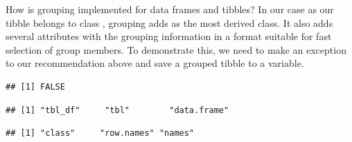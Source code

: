 \documentclass[krantz2]{krantz}\usepackage{knitr}
\begin{document}
\begin{warningbox}
How is grouping implemented for data frames and tibbles? In our case as our tibble belongs to class , grouping adds  as the most derived class. It also adds several attributes with the grouping information in a format suitable for fast selection of group members. To demonstrate this, we need to make an exception to our recommendation above and save a grouped tibble to a variable.

\begin{knitrout}\footnotesize
{}\color{fgcolor}\begin{kframe}
\begin{alltt}
 \hlkwb{<-} \hlstd{(} \hlstd{=} \hlopt{:}\hlstd{,}  \hlstd{=} \hlstd{(letters[}\hlopt{:}\hlstd{],} \hlstd{))}
\end{alltt}
\begin{verbatim}
## [1] FALSE
\end{verbatim}
\begin{alltt}
\end{alltt}
\begin{verbatim}
## [1] "tbl_df"     "tbl"        "data.frame"
\end{verbatim}
\begin{alltt}
\hlstd{(}
\end{alltt}
\begin{verbatim}
## [1] "class"     "row.names" "names"
\end{verbatim}
\end{kframe}
\end{knitrout}


\end{warningbox}
\end{document}
